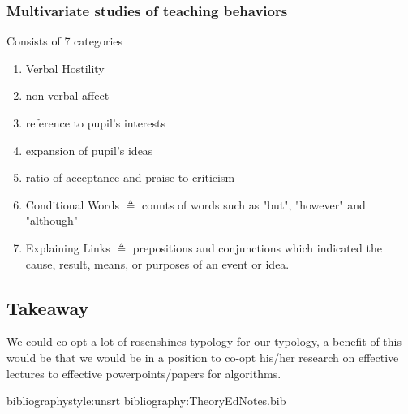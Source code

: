 \documentclass[10pt, letterpaper]{article}
\begin{document}
\subsubsection*{Multivariate studies of teaching behaviors}
\label{sec:orgecd5873}
Consists of 7 categories
\begin{enumerate}
\item Verbal Hostility
\item non-verbal affect
\item reference to pupil's interests
\item expansion of pupil's ideas
\item ratio of acceptance and praise to criticism
\item Conditional Words \(\triangleq\) counts of words such as "but", "however" and "although"
\item Explaining Links \(\triangleq\) prepositions and conjunctions which indicated the cause, result, means, or purposes of an event or idea.
\end{enumerate}

\subsection*{Takeaway}
\label{sec:org71f65e5}
We could co-opt a lot of rosenshines typology for our typology, a benefit of this would be that we would be in a position to co-opt his/her research on effective lectures to effective powerpoints/papers for algorithms.


bibliographystyle:unsrt
bibliography:TheoryEdNotes.bib
\end{document}
